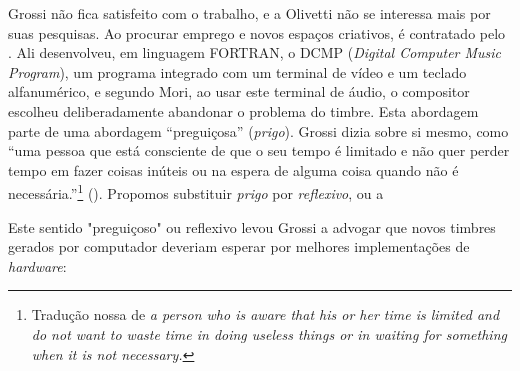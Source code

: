 Grossi não fica satisfeito com o trabalho, e a Olivetti não se interessa mais por suas pesquisas. Ao procurar emprego e novos espaços criativos, é contratado pelo  \cite[p.~126]{mori_pietro_2015}. Ali desenvolveu, em linguagem FORTRAN, o DCMP (\emph{Digital Computer Music Program}), um programa integrado com um terminal de vídeo e um teclado alfanumérico, e segundo Mori, ao usar este terminal de áudio, o compositor escolheu deliberadamente abandonar o problema do timbre.  Esta abordagem parte de uma abordagem ``preguiçosa'' (\emph{prigo}). Grossi dizia sobre si mesmo, como ``uma pessoa que está consciente de que o seu tempo é limitado e não quer perder tempo em fazer coisas inúteis ou na espera de alguma coisa quando não é necessária.''\footnote{Tradução nossa de \emph{a person who is aware that his or her time is limited and do not want to waste time in doing useless things or in waiting for something when it is not necessary.}} (\idemibdem). 
Propomos substituir \emph{prigo} por \emph{reflexivo}, ou a 

Este sentido "preguiçoso" ou reflexivo levou Grossi a advogar que novos timbres gerados por computador deveriam esperar por melhores implementações de \emph{hardware}:

